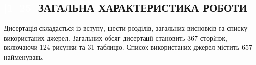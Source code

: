 

\begin{center}
\section*{
\textcolor{white}{[1--25]}
\MakeUppercase{Загальна характеристика роботи}
\textcolor{white}
{\cite{Olikh2018JAP,Olikh2018SM,Olikh:Ultras2016,Olikh2016JSem,
Olikh:Rev,OlikhJAP,Olikh:Ultras,Olikh:UPJ2014,
Olikh:2013IEEE,Olikh:SEMT2013,Olikh:FTP2013,Olikh:UPJ2013,
Olikh:FTP2011,Olikh:SEMT2011,Olikh:UPJ2010,Gorb2010,Olikh:FTP2009,
Olikh:SEMT2007,Olikh:MRS2007a,Olikh:PZTF2006,
Olikh:PhChOM2005,Olikh:PJE2004,Olikh:SEMT2004,Olikh:SPQEO2003,
Olikh:Visn2003,
1UNCPS,3Tomsk,1SEMST,50IUFFC,9APTTE,2005IUS,ICU2007SC,ICU2007GA,2007MRS,3UNCPS,6DrogGorb,6Drog,
4UNCPS,2009DRIP13,4Kremen,7Drog,5UNCPS,2012Ternop,14Plivk,8Drog,2013Buk,6UNCPS,2014IUSOl,2014IUS,6SEMST,
2015ICU,6CPFCS,7UNCPS,2017MEICS}}
}
\end{center}




{\structureTXT}
Дисертація складається із вступу, шести розділів, загальних висновків та списку використаних джерел.
Загальних обсяг дисертації становить
367 сторiнок, включаючи 124 рисунки та 31 таблицю.
Список використаних джерел містить 657 найменувань.

